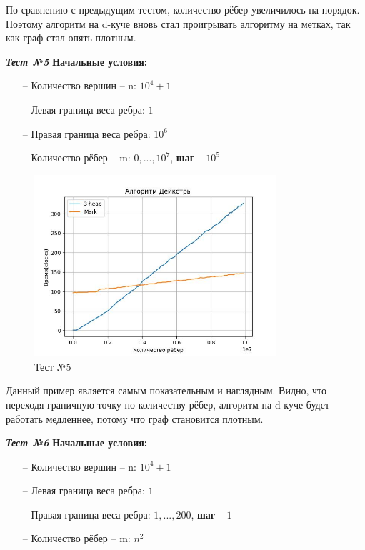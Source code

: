 \begin{text}
По сравнению с предыдущим тестом, количество рёбер увеличилось на порядок. Поэтому алгоритм на d-куче вновь стал проигрывать алгоритму на метках, так как граф стал опять плотным.\\
\newpage

\begin{center}
\textbf{\textit{Тест №5}}
\textbf{Начальные условия:}

\begin{enumerate}
	\item[--] Количество вершин -- n: $10^4 + 1$
	\item[--] Левая граница веса ребра: $1$
	\item[--] Правая граница веса ребра: $10^6$
	\item[--] Количество рёбер -- m: $0,...,10^7$, \textbf{шаг} -- $10^5$
\end{enumerate}

\end{center}
\begin{figure}[h]
  \centering
  \includegraphics[width=0.8\textwidth]{pictures/5.jpeg}
  \caption{Тест №5}
  \label{fig:pict_5}
\end{figure}

Данный пример является самым показательным и наглядным. Видно, что переходя граничную точку по количеству рёбер, алгоритм на d-куче будет работать медленнее, потому что граф становится плотным.\\
\newpage

\begin{center}
\textbf{\textit{Тест №6}}
\textbf{Начальные условия:}

\begin{enumerate}
	\item[--] Количество вершин -- n: $10^4 + 1$
	\item[--] Левая граница веса ребра: $1$
	\item[--] Правая граница веса ребра: $1,...,200$, \textbf{шаг} -- $1$
	\item[--] Количество рёбер -- m: $n^2$
\end{enumerate}


\end{center}
\end{text}
